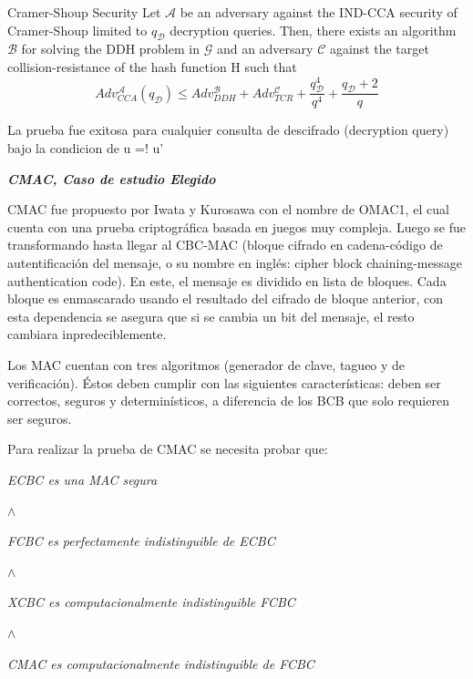 \documentclass[runningheads,a4paper]{llncs}
\begin{document}
\begin{theorem}{Cramer-Shoup Security}
Let $\mathcal{A}$ be an adversary against the IND-CCA security
of Cramer-Shoup limited to $q_\mathcal{D}$ decryption queries. Then, there exists an algorithm $\mathcal{B}$ for solving the
DDH problem in $\mathcal{G}$ and an adversary $\mathcal{C}$ against the target collision-resistance of the hash function H
such that
\[Adv_{CCA}^\mathcal{A}(q_\mathcal{D}) \leq Adv_{DDH}^\mathcal{B} + Adv_{TCR}^\mathcal{C} + \frac{q_\mathcal{D}^4}{q^4} + \frac{q_\mathcal{D} + 2}{q}\]
\end{theorem}

La prueba fue exitosa para cualquier consulta de descifrado (decryption query) bajo la condicion de u =! u'\cite{article3}

\centerline{\textbf{{\emph{CMAC, Caso de estudio Elegido}}}}
CMAC fue propuesto por Iwata y Kurosawa con el nombre de OMAC1, el cual cuenta con una prueba criptográfica basada en juegos muy compleja. Luego se fue transformando hasta llegar al CBC-MAC (bloque cifrado en cadena-código de autentificación del mensaje, o su nombre en inglés: cipher block chaining-message authentication code). En este, el mensaje es dividido en lista de bloques. Cada bloque es enmascarado usando el resultado del cifrado de bloque anterior, con esta dependencia se asegura que si se cambia un bit  del mensaje, el resto cambiara inpredeciblemente.

Los MAC cuentan con tres algoritmos (generador de clave, tagueo y de verificación). Éstos deben cumplir con las siguientes características: deben ser correctos, seguros y determinísticos, a diferencia de los BCB que solo requieren ser seguros.

Para realizar la prueba de CMAC se necesita probar que:

\centerline{\emph{ECBC es una MAC segura}}
\centerline{$\land$}
\centerline{\emph{FCBC es perfectamente indistinguible de ECBC}}
\centerline{$\land$}
\centerline{\emph{XCBC es computacionalmente indistinguible FCBC}}
\centerline{$\land$}
\centerline{\emph{CMAC es computacionalmente indistinguible de FCBC}}
\end{document}
